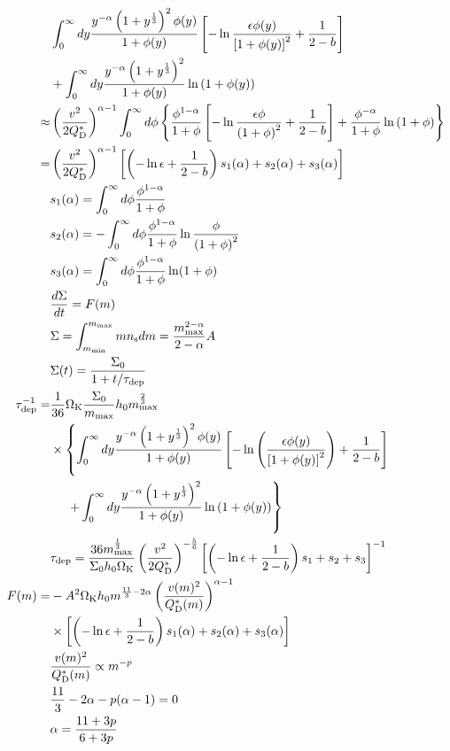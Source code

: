 \documentclass[11pt,a4paper,oneside,onecolumn]{jreport}
\begin{document}
\begin{align}
 &\int_0^{\infty} dy \frac{y^{- \alpha} \left( 1 + y^{\frac{1}{3}} \right)^2 \phi(y)}{1 + \phi(y)} \left[ - \ln \frac{\epsilon \phi(y)}{\left[ 1 + \phi(y) \right]^2} + \frac{1}{2 - b} \right]\\
 &+ \int_0^{\infty} dy \frac{y^{- \alpha} \left( 1 + y^{\frac{1}{3}} \right)^2}{1 + \phi(y)} \ln \left( 1 + \phi(y) \right)\\
 \approx& \left(\frac{v^2}{2Q_{\rm D}^{\ast}}\right)^{\alpha - 1} \int_0^{\infty} d \phi \left\{ \frac{\phi^{1 - \alpha}}{1 + \phi} \left[ - \ln \frac{\epsilon \phi}{\left(1 + \phi\right)^2} + \frac{1}{2 - b} \right] + \frac{\phi^{- \alpha}}{1 + \phi} \ln \left(1 + \phi \right) \right\}\\
 =& \left(\frac{v^2}{2Q_{\rm D}^{\ast}}\right)^{\alpha - 1} \left[ \left(- \ln \epsilon + \frac{1}{2 - b} \right) s_1(\alpha) + s_2(\alpha) + s_3(\alpha) \right]\\
 &s_1(\alpha) = \int_0^{\infty} d \phi \frac{\phi^{1 - \alpha}}{1 + \phi}\\
 &s_2(\alpha) = - \int_0^{\infty} d \phi \frac{\phi^{1 - \alpha}}{1 + \phi} \ln \frac{\phi}{\left(1 + \phi \right)^2}\\
 &s_3(\alpha) = \int_0^{\infty} d \phi \frac{\phi^{1 - \alpha}}{1 + \phi} \ln (1 + \phi)\\
 &\frac{d \Sigma}{d t} = F(m)\\
 &\Sigma = \int_{m_{\rm min}}^{m_{\rm max}} m n_{\rm s} dm = \frac{m_{\rm max}^{2 - \alpha}}{2 - \alpha} A\\ 
 &\Sigma(t) = \frac{\Sigma_0}{1 + t/\tau_{\rm dep}}\\
 \tau_{\rm dep}^{-1} =& \frac{1}{36}\Omega_{\rm K}\frac{\Sigma_0}{m_{\rm max}}h_0 m_{\rm max}^{\frac{2}{3}}\\
 &\times \left\{ \int_0^{\infty} dy \frac{y^{-\alpha}\left(1 + y^{\frac{1}{3}}\right)^2\phi(y)}{1 + \phi(y)} \left[ - \ln \left( \frac{\epsilon\phi(y)}{\left[1 + \phi(y)\right]^2} \right) + \frac{1}{2 - b} \right] \right.\\
 &\left. \ \ \ \ + \int_0^{\infty} dy \frac{y^{- 
\alpha}\left(1 + y^{\frac{1}{3}}\right)^2}{1 + \phi(y)} \ln \left( 1 + \phi(y) \right) \right\}\\
 &\tau_{\rm dep} = \frac{36 m_{\rm max}^{\frac{1}{3}}}{\Sigma_0h_0\Omega_{\rm K}} \left( \frac{v^2}{2Q_{\rm D}^{\ast}} \right)^{- \frac{5}{6}} \left[ \left(- \ln \epsilon + \frac{1}{2 - b} \right) s_1 + s_2 + s_3 \right]^{-1}\\
 F(m) =& - A^2 \Omega_{\rm K} h_0 m^{\frac{11}{3} - 2 \alpha} \left( \frac{v(m)^2}{Q_{\rm D}^{\ast}(m)} \right)^{\alpha - 1}\\
 &\times \left[ \left( - \ln \epsilon + \frac{1}{2 - b} \right) s_1(\alpha) + s_2(\alpha) + s_3(\alpha) \right]\\
 &\frac{v(m)^2}{Q_{\rm D}^{\ast}(m)} \propto m^{-p}\\ 
 &\frac{11}{3}-2\alpha-p(\alpha-1) = 0\\
 &\alpha = \frac{11+3p}{6+3p}
\end{align}
\end{document}
